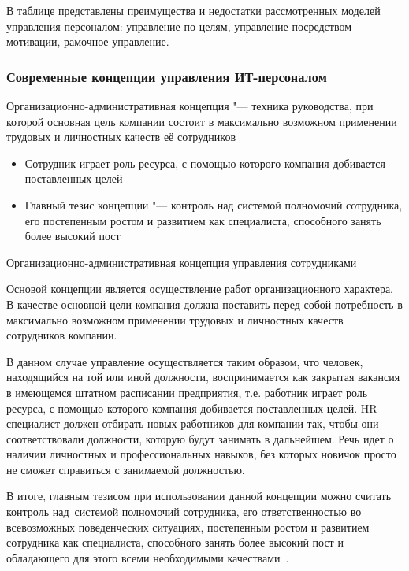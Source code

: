 \documentclass{../industrial-development}
\begin{document}
В таблице представлены преимущества и недостатки рассмотренных моделей управления персоналом: управление по целям, управление посредством мотивации, рамочное управление.

\begin{frame} \frametitle{Современные концепции управления ИТ-персоналом}
	\alert{Организационно-административная концепция} "--- техника руководства, при которой основная цель компании состоит в максимально возможном применении трудовых и личностных качеств её сотрудников
	\begin{itemize}
		\item Сотрудник играет роль ресурса, с помощью которого компания добивается поставленных целей
		\item Главный тезис концепции "--- контроль над системой полномочий сотрудника, его постепенным ростом и развитием как специалиста, способного занять более высокий пост
	\end{itemize}
\end{frame}

\lecturenotes

\alert{Организационно-административная концепция управления сотрудниками}

Основой концепции является осуществление работ организационного характера. В качестве основной цели компания должна поставить перед собой потребность в максимально возможном применении трудовых и личностных качеств сотрудников компании.

В данном случае управление осуществляется таким образом, что человек, находящийся на той или иной должности, воспринимается как закрытая вакансия в имеющемся штатном расписании предприятия, т.е. работник играет роль ресурса, с помощью которого компания добивается поставленных целей. HR-специалист должен отбирать новых работников для компании так, чтобы они соответствовали должности, которую будут занимать в дальнейшем. Речь идет о наличии личностных и профессиональных навыков, без которых новичок просто не сможет справиться с занимаемой должностью. 

В итоге, главным тезисом при использовании данной концепции можно считать контроль над~системой полномочий сотрудника, его ответственностью во всевозможных поведенческих ситуациях, постепенным ростом и развитием сотрудника как специалиста, способного занять более высокий пост и обладающего для этого всеми необходимыми качествами~\cite{Sovrconcept}. 
\end{document}
